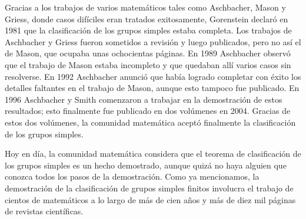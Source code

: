 Gracias a los trabajos de varios matemáticos tales como Aschbacher, Mason y
Griess, donde casos difíciles eran tratados exitosamente, Gorenstein declaró en
1981 que la clasificación de los grupos simples estaba completa. Los trabajos
de Aschbacher y Griess fueron sometidos a revisión y luego publicados, pero no
así el de Mason, que ocupaba unas ochocientas páginas.  En 1989 Aschbacher
observó que el trabajo de Mason estaba incompleto y que quedaban allí varios casos
sin resolverse. En 1992 Aschbacher anunció que había logrado completar con
éxito los detalles faltantes en el trabajo de Mason, aunque esto tampoco fue
publicado. En 1996 Aschbacher y Smith comenzaron a trabajar en la demostración 
de estos resultados; esto finalmente fue publicado en dos volúmenes en 2004. Gracias
de estos dos volúmenes, 
la comunidad matemática aceptó finalmente la clasificación de los
grupos simples. 

Hoy en día, la comunidad matemática considera que el 
teorema de clasificación de los grupos
simples es un hecho demostrado, aunque quizá no haya alguien que conozca todos
los pasos de la demostración. Como ya mencionamos, la demostración 
de la clasificación de grupos simples finitos involucra el trabajo de cientos de
matemáticos a lo largo de más de cien años y más de diez mil páginas de
revistas científicas. 






